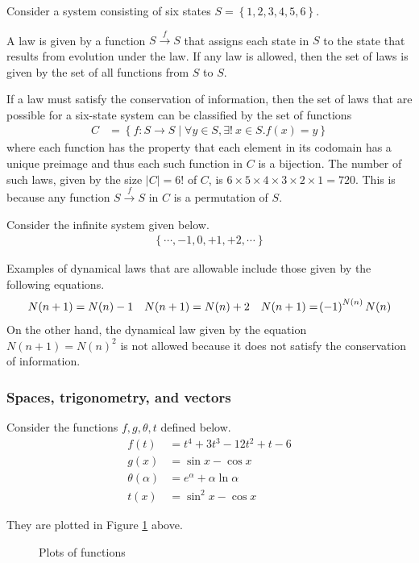 \begin{answer}
	Consider a system consisting of six states $S = \left\{1, 2, 3, 4, 5, 6\right\}$.

	A law is given by a function $S \xrightarrow{f} S$ that assigns each state in $S$ to the state that results from evolution under the law.
	If any law is allowed, then the set of laws is given by the set of all functions from $S$ to $S$.

	If a law must satisfy the conservation of information, then the set of laws that are possible for a six-state system can be classified by the set of functions
	\begin{align}
		C & = \left\{ f : S \to S \mid \forall y \in S, \exists!\ x \in S. f(x) = y \right\}
	\end{align}
	where each function has the property that each element in its codomain has a unique preimage and thus each such function in $C$ is a bijection.
	The number of such laws, given by the size $\left|C\right| = 6!$ of $C$, is $6 \times 5 \times 4 \times 3 \times 2 \times 1 = 720$.
	This is because any function $S \xrightarrow{f} S$ in $C$ is a permutation of $S$.
\end{answer}

\begin{answer}
	Consider the infinite system given below.
	\begin{align}
		\left\{\cdots, -1, 0, +1, +2, \cdots\right\}
	\end{align}

	Examples of dynamical laws that are allowable include those given by the following equations.
	\begin{align*}
		N(n+1) = N(n) - 1 \quad
		N(n+1) = N(n) + 2 \quad
		N(n+1) = \!\left(-1\right)^{N(n)} N(n)
	\end{align*}
	On the other hand, the dynamical law given by the equation $N(n+1) = N(n)^2$ is not allowed because it does not satisfy the conservation of information.
\end{answer}

\subsubsection{Spaces, trigonometry, and vectors}
\setcounter{answer}{0}

\begin{answer}[Plots]
	Consider the functions $f,g,\theta,t$ defined below.
	\begin{align}
		f(t)           & = t^4 + 3t^3 - 12t^2 + t - 6   \\
		g(x)           & = \sin x - \cos x              \\
		\theta(\alpha) & = e^\alpha + \alpha \ln \alpha \\
		t(x)           & = \sin^2x - \cos x
	\end{align}

	They are plotted in Figure \ref{fig:plot} above.
	\begin{figure}
		
		\caption{Plots of functions}
		\label{fig:plot}
	\end{figure}
\end{answer}

